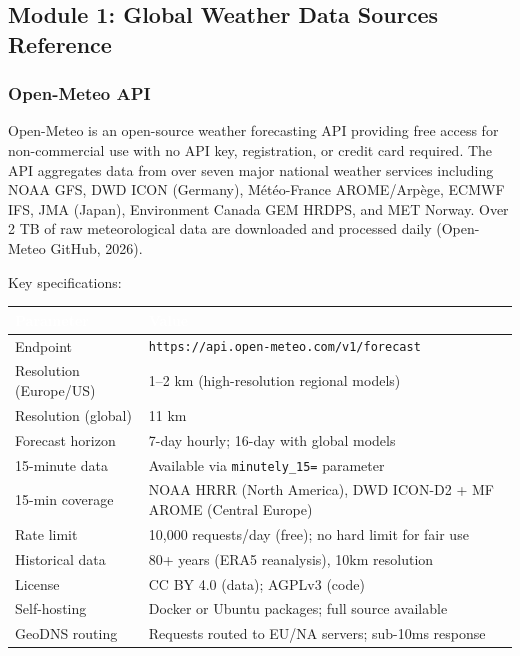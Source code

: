 \documentclass[11pt,letterpaper]{article}
\newcommand{\tableheader}[1]{\textbf{\sffamily\textcolor{white}{#1}}}
\begin{document}
\subsection{Module 1: Global Weather Data Sources Reference}

\subsubsection{Open-Meteo API}

Open-Meteo is an open-source weather forecasting API providing free access for non-commercial use with no API key, registration, or credit card required. The API aggregates data from over seven major national weather services including NOAA GFS, DWD ICON (Germany), Météo-France AROME/Arpège, ECMWF IFS, JMA (Japan), Environment Canada GEM HRDPS, and MET Norway. Over 2 TB of raw meteorological data are downloaded and processed daily (Open-Meteo GitHub, 2026).

Key specifications:
\begin{center}
\begin{tabularx}{\textwidth}{L{3.5cm}X}
\toprule
{}
\tableheader{Parameter} & \tableheader{Value} \\
\midrule
Endpoint & \texttt{https://api.open-meteo.com/v1/forecast} \\
Resolution (Europe/US) & 1--2 km (high-resolution regional models) \\
Resolution (global) & 11 km \\
Forecast horizon & 7-day hourly; 16-day with global models \\
15-minute data & Available via \texttt{minutely\_15=} parameter \\
15-min coverage & NOAA HRRR (North America), DWD ICON-D2 + MF AROME (Central Europe) \\
Rate limit & 10,000 requests/day (free); no hard limit for fair use \\
Historical data & 80+ years (ERA5 reanalysis), 10km resolution \\
License & CC BY 4.0 (data); AGPLv3 (code) \\
Self-hosting & Docker or Ubuntu packages; full source available \\
GeoDNS routing & Requests routed to EU/NA servers; sub-10ms response \\
\bottomrule
\end{tabularx}
\end{center}
\end{document}

